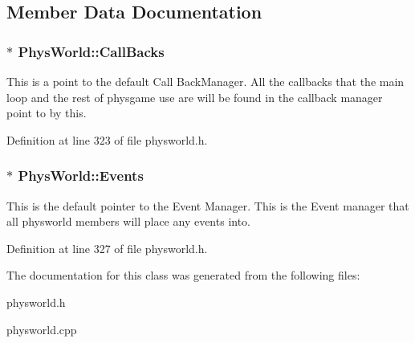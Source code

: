 \subsection{Member Data Documentation}
\hypertarget{classPhysWorld_a080ea6f1584374b07d3c1f29c7ed64df}{
\subsubsection[{CallBacks}]{$\ast$ {\bf PhysWorld::CallBacks}}}
\label{db/df5/classPhysWorld_a080ea6f1584374b07d3c1f29c7ed64df}


This is a point to the default Call BackManager. All the callbacks that the main loop and the rest of physgame use are will be found in the callback manager point to by this. 

Definition at line 323 of file physworld.h.\hypertarget{classPhysWorld_a601b3c6093aaf2a69fcd3311dde9aadc}{
\subsubsection[{Events}]{$\ast$ {\bf PhysWorld::Events}}}
\label{db/df5/classPhysWorld_a601b3c6093aaf2a69fcd3311dde9aadc}


This is the default pointer to the Event Manager. This is the Event manager that all physworld members will place any events into. 

Definition at line 327 of file physworld.h.

The documentation for this class was generated from the following files:\begin{DoxyCompactItemize}
\item 
physworld.h\item 
physworld.cpp\end{DoxyCompactItemize}
